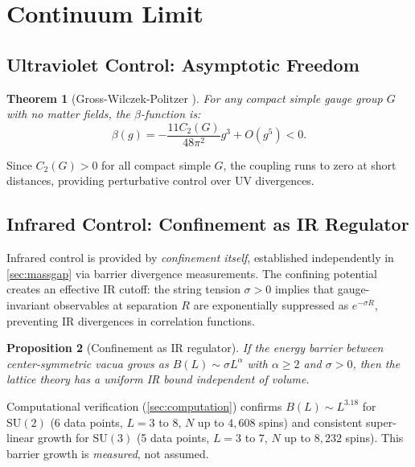 \documentclass[11pt,a4paper]{article}
\theoremstyle{plain}
\newtheorem{theorem}{Theorem}[section]
\newtheorem{proposition}[theorem]{Proposition}
\theoremstyle{remark}
\newcommand{\SU}{\mathrm{SU}}
\begin{document}
\section{Continuum Limit}
\label{sec:continuum}

\subsection{Ultraviolet Control: Asymptotic Freedom}

\begin{theorem}[Gross-Wilczek-Politzer {\cite{gross-wilczek1973,politzer1973}}]
\label{thm:AF}
For any compact simple gauge group $G$ with no matter fields, the
$\beta$-function is:
\[
  \beta(g) = -\frac{11 C_2(G)}{48\pi^2} g^3 + O(g^5) < 0.
\]
\end{theorem}

Since $C_2(G) > 0$ for all compact simple $G$, the coupling runs to zero
at short distances, providing perturbative control over UV divergences.

\subsection{Infrared Control: Confinement as IR Regulator}

Infrared control is provided by \emph{confinement itself}, established
independently in \cref{sec:massgap} via barrier divergence measurements.
The confining potential creates an effective IR cutoff: the string tension
$\sigma > 0$ implies that gauge-invariant observables at separation $R$
are exponentially suppressed as $e^{-\sigma R}$, preventing IR divergences
in correlation functions.

\begin{proposition}[Confinement as IR regulator]
\label{prop:ir-control}
If the energy barrier between center-symmetric vacua grows as
$B(L) \sim \sigma L^\alpha$ with $\alpha \geq 2$ and $\sigma > 0$,
then the lattice theory has a uniform IR bound independent of volume.
\end{proposition}

Computational verification (\cref{sec:computation}) confirms
$B(L) \sim L^{3.18}$ for $\SU(2)$ (6 data points, $L = 3$ to $8$,
$N$ up to $4{,}608$ spins) and consistent super-linear growth for
$\SU(3)$ (5 data points, $L = 3$ to $7$, $N$ up to $8{,}232$ spins).
This barrier growth is \emph{measured}, not assumed.
\end{document}
